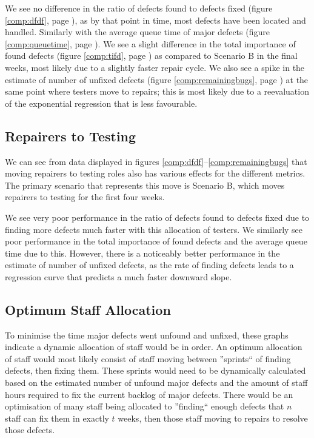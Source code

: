 \documentclass[a4paper,10pt]{article}
\begin{document}
We see no difference in the ratio of defects found to defects fixed (figure \ref{comp:dfdf}, page \pageref{comp:dfdf}), as by that point in time, most defects have been located and handled. Similarly with the average queue time of major defects (figure \ref{comp:queuetime}, page \pageref{comp:queuetime}). We see a slight difference in the total importance of found defects (figure \ref{comp:tifd}, page \pageref{comp:tifd}) as compared to Scenario B in the final weeks, most likely due to a slightly faster repair cycle. We also see a spike in the estimate of number of unfixed defects (figure \ref{comp:remainingbugs}, page \pageref{comp:remainingbugs}) at the same point where testers move to repairs; this is most likely due to a reevaluation of the exponential regression that is less favourable.

\subsection{Repairers to Testing}
We can see from data displayed in figures \ref{comp:dfdf}--\ref{comp:remainingbugs} that moving repairers to testing roles also has various effects for the different metrics. The primary scenario that represents this move is Scenario B, which moves repairers to testing for the first four weeks.

We see very poor performance in the ratio of defects found to defects fixed due to finding more defects much faster with this allocation of testers. We similarly see poor performance in the total importance of found defects and the average queue time due to this. However, there is a noticeably better performance in the estimate of number of unfixed defects, as the rate of finding defects leads to a regression curve that predicts a much faster downward slope.

\subsection{Optimum Staff Allocation}
To minimise the time major defects went unfound and unfixed, these graphs indicate a dynamic allocation of staff would be in order. An optimum allocation of staff would most likely consist of staff moving between ''sprints`` of finding defects, then fixing them. These sprints would need to be dynamically calculated based on the estimated number of unfound major defects and the amount of staff hours required to fix the current backlog of major defects. There would be an optimisation of many staff being allocated to ''finding`` enough defects that $n$ staff can fix them in exactly $t$ weeks, then those staff moving to repairs to resolve those defects.
\end{document}
